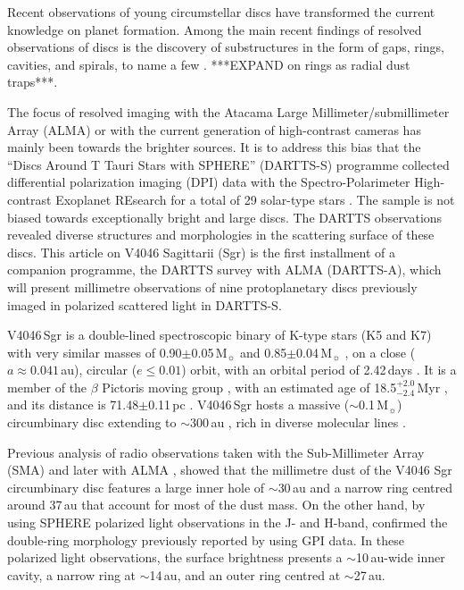\documentclass[fleqn,usenatbib,useAMS]{mnras}
\begin{document}
Recent observations of young circumstellar discs have transformed the current knowledge on planet formation. Among the main recent findings of resolved observations of discs is the discovery of substructures in the form of gaps, rings, cavities, and spirals, to name a few \citep[see,][and references there in]{Andrews_2020_aug}. ***EXPAND on rings as radial dust traps***.  

The focus of resolved imaging with the Atacama Large Millimeter/submillimeter Array (ALMA) or with the current generation of high-contrast cameras has mainly been towards the brighter sources. It is to address this bias that the ``Discs Around T Tauri Stars with SPHERE'' (DARTTS-S) programme collected differential polarization imaging (DPI) data with the Spectro-Polarimeter High-contrast Exoplanet REsearch \citep[SPHERE][]{2019A&A...631A.155B} for a total of 29 solar-type stars \citep[][]{Avenhaus_2018,Garufi2020}. The sample is not biased towards exceptionally bright and large discs. The DARTTS observations revealed diverse structures and morphologies in the scattering surface of these discs. This article on V4046 Sagittarii (Sgr) is the first installment of a companion programme, the DARTTS survey with ALMA (DARTTS-A), which will present millimetre observations of nine protoplanetary discs previously imaged in polarized scattered light in DARTTS-S.

V4046\,Sgr is a double-lined spectroscopic binary of K-type stars (K5 and K7) with very similar masses of 0.90$\pm$0.05\,M$_{\sun}$ and 0.85$\pm$0.04\,M$_{\sun}$ \citep{Rosenfeld_2012}, on a close ($a \approx 0.041$\,au), circular ($e\leq0.01$) orbit, with an orbital period of 2.42\,days \citep{2000IAUS..200P..28Q}. It is a member of the $\beta$ Pictoris moving group \citep{Zuckerman_2004}, with an estimated age of 18.5$^{+2.0}_{-2.4}$\,Myr \citep{2020A&A...642A.179M}, and its distance is 71.48$\pm$0.11\,pc \citep{gaiacollaboration2020gaia}. V4046\,Sgr hosts a massive ($\sim$0.1\,M$_{\sun}$) circumbinary disc extending to $\sim$300\,au \citep{Rosenfeld_2013, Rodriguez_2010}, rich in diverse molecular lines \citep{Kastner_2018}.

Previous analysis of radio observations taken with the Sub-Millimeter Array (SMA) \citep{Rosenfeld_2013} and later with ALMA \citep{Guzman_2017,Huang_2017,Bergner_2018,Kastner_2018}, showed that the millimetre dust of the V4046 Sgr circumbinary disc features a large inner hole of $\sim$30\,au and a narrow ring centred around 37\,au that account for most of the dust mass. On the other hand, by using SPHERE polarized light observations in the J- and H-band, \citet{Avenhaus_2018} confirmed the double-ring morphology previously reported by \citet{Rapson_2015} using GPI data. In these polarized light observations, the surface brightness presents a $\sim$10\,au-wide inner cavity, a narrow ring at $\sim$14\,au, and an outer ring centred at $\sim$27\,au.
\end{document}
